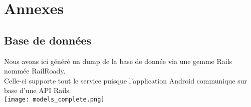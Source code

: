 \documentclass{report}
\begin{document}
\chapter{Annexes} %

	\section{Base de données}

		Nous avons ici généré un dump de la base de donnée via une gemme Rails nommée RailRoady.\\
		Celle-ci supporte tout le service puisque l'application Android communique sur base d'une API Rails.\\

		\texttt{[image: models\_complete.png]}

	
\end{document}
